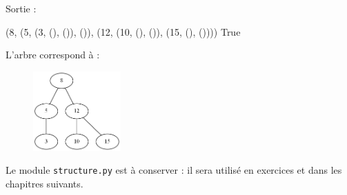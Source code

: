 \documentclass[
  a4paper,
  DIV=11,
  numbers=noendperiod]{scrartcl}
\newenvironment{Shaded}{\begin{snugshade}}{\end{snugshade}}
\newcommand{\DecValTok}[1]{\textcolor[rgb]{0.68,0.00,0.00}{#1}}
\newcommand{\NormalTok}[1]{\textcolor[rgb]{0.00,0.23,0.31}{#1}}
\newcommand{\VariableTok}[1]{\textcolor[rgb]{0.07,0.07,0.07}{#1}}
\begin{document}
Sortie :

\begin{Shaded}
\begin{Highlighting}[]
\NormalTok{(}\DecValTok{8}\NormalTok{, (}\DecValTok{5}\NormalTok{, (}\DecValTok{3}\NormalTok{, (), ()), ()), (}\DecValTok{12}\NormalTok{, (}\DecValTok{10}\NormalTok{, (), ()), (}\DecValTok{15}\NormalTok{, (), ())))}
\VariableTok{True}
\end{Highlighting}
\end{Shaded}

L'arbre correspond à :

\begin{figure}

{\centering \includegraphics[width=0.3\textwidth,height=\textheight]{arbre.gv.png}

}

\end{figure}

Le module \texttt{structure.py} est à conserver : il sera utilisé en
exercices et dans les chapitres suivants.
\end{document}
